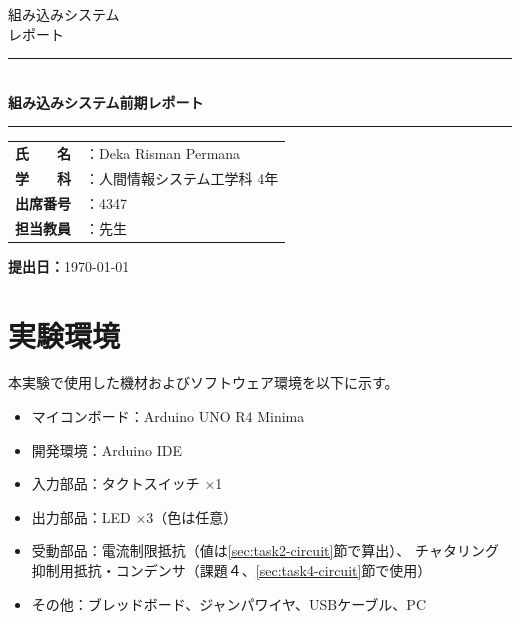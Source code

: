 \documentclass[12pt,a4paper]{ltjsarticle}
\title{}
\date{}
\author{}
\newcommand{\HRule}{\rule{\linewidth}{0.5mm}}
\begin{document}

\begin{titlepage}
  \thispagestyle{titlepage}
  \centering
  \vspace*{2cm}

  {\large 組み込みシステム}\\[0.5em]
  {\large レポート}\\[2em]

  \HRule{}\\[1em]
  {\LARGE \textbf{組み込みシステム前期レポート}}\\[0.5em]
  \HRule{}

  \vspace{3cm}

  \begin{tabular}{rl}
    \textbf{氏　　名} & ：Deka Risman Permana \\[0.4em]
    \textbf{学　　科} & ：人間情報システム工学科 4年 \\[0.4em]
    \textbf{出席番号} & ：4347 \\[0.4em]
    \textbf{担当教員} & ：先生 \\
  \end{tabular}

  \vfill

  \textbf{提出日：}\today

\end{titlepage}

\newpage
\thispagestyle{frontmatter}
\tableofcontents

\newpage
{}
\setcounter{page}{1}


\section{実験環境}\label{sec:env}

本実験で使用した機材およびソフトウェア環境を以下に示す。
\begin{itemize}
  \item マイコンボード：Arduino UNO R4 Minima
  \item 開発環境：Arduino IDE
  \item 入力部品：タクトスイッチ ×1
  \item 出力部品：LED ×3（色は任意）
  \item 受動部品：電流制限抵抗（値は\ref{sec:task2-circuit}節で算出）、
        チャタリング抑制用抵抗・コンデンサ（課題４、\ref{sec:task4-circuit}節で使用）
  \item その他：ブレッドボード、ジャンパワイヤ、USBケーブル、PC
\end{itemize}
\end{document}

